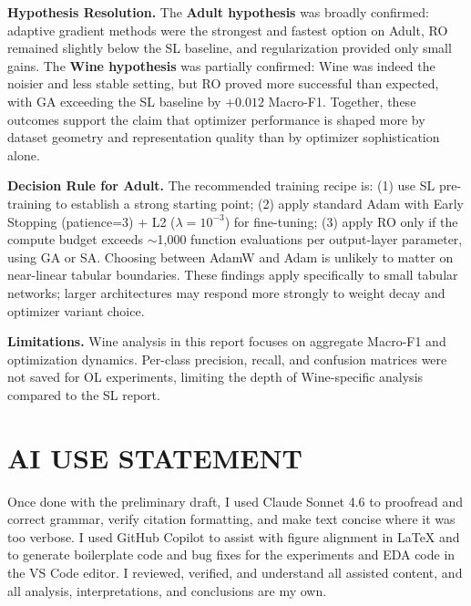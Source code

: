 \documentclass[letterpaper, 10 pt, conference]{ieeeconf}
\begin{document}
\textbf{Hypothesis Resolution.} The \textbf{Adult hypothesis} was broadly confirmed: adaptive gradient methods were the strongest and fastest option on Adult, RO remained slightly below the SL baseline, and regularization provided only small gains. The \textbf{Wine hypothesis} was partially confirmed: Wine was indeed the noisier and less stable setting, but RO proved more successful than expected, with GA exceeding the SL baseline by $+0.012$ Macro-F1. Together, these outcomes support the claim that optimizer performance is shaped more by dataset geometry and representation quality than by optimizer sophistication alone.

\textbf{Decision Rule for Adult.} The recommended training recipe is: (1) use SL pre-training to establish a strong starting point; (2) apply standard Adam with Early Stopping (patience=3) + L2 ($\lambda=10^{-3}$) for fine-tuning; (3) apply RO only if the compute budget exceeds $\sim$1{,}000 function evaluations per output-layer parameter, using GA or SA. Choosing between AdamW and Adam is unlikely to matter on near-linear tabular boundaries. These findings apply specifically to small tabular networks; larger architectures may respond more strongly to weight decay and optimizer variant choice.

\textbf{Limitations.} Wine analysis in this report focuses on aggregate Macro-F1 and optimization dynamics. Per-class precision, recall, and confusion matrices were not saved for OL experiments, limiting the depth of Wine-specific analysis compared to the SL report.

\section*{AI USE STATEMENT}

Once done with the preliminary draft, I used Claude Sonnet 4.6 to proofread and correct grammar, verify citation formatting, and make text concise where it was too verbose. I used GitHub Copilot to assist with figure alignment in LaTeX and to generate boilerplate code and bug fixes for the experiments and EDA code in the VS Code editor. I reviewed, verified, and understand all assisted content, and all analysis, interpretations, and conclusions are my own.

\addtolength{\textheight}{-12cm}

\end{document}

